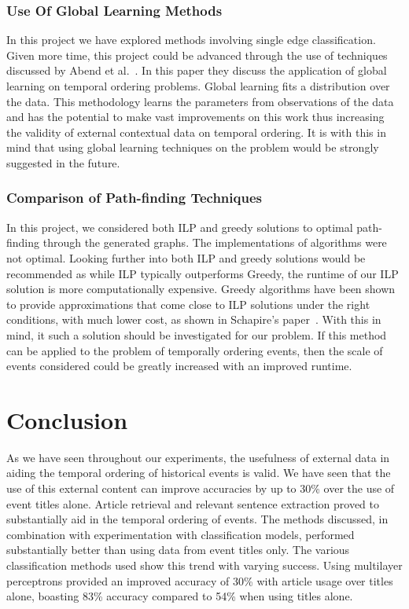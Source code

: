 \documentclass[bsc,frontabs,twoside,singlespacing,parskip,deptreport]{infthesis}     %
\begin{document}
\subsection{Use Of Global Learning Methods}
In this project we have explored methods involving single edge classification. Given more time,
this project could be advanced through the use of techniques discussed by Abend et al.~\cite{abend2015lexical}.
In this paper they discuss the application of global learning on temporal ordering problems. Global learning
fits a distribution over the data. This methodology learns the parameters from observations of the data~\cite{Huang2008}
and has the potential to make vast improvements on this work thus increasing the validity
of external contextual data on temporal ordering. It is with this in mind that using global learning techniques on the problem
would be strongly suggested in the future.

\subsection{Comparison of Path-finding Techniques}
In this project, we considered both ILP and greedy solutions to optimal path-finding through the generated graphs.
The implementations of algorithms were not optimal. Looking further into both ILP and greedy solutions would
be recommended as while ILP typically outperforms Greedy, the runtime of our ILP solution is more computationally
expensive. Greedy algorithms have been shown to provide approximations that come close to ILP solutions under the right
conditions, with much lower cost, as shown in Schapire's paper~\cite{schapire1998learning}. With this in mind,
it such a solution should be investigated for our problem. If this method can
be applied to the problem of temporally ordering events, then the scale of events considered could be greatly increased with
an improved runtime.



\chapter{Conclusion}
As we have seen throughout our experiments, the usefulness of external data in aiding the temporal ordering
of historical events is valid. We have seen that the use of this external content can improve accuracies by up to
30\% over the use of event titles alone.
Article retrieval and relevant sentence extraction proved to substantially aid in the temporal ordering of events.
The methods discussed, in combination with experimentation with classification models, performed substantially better
than using data from event titles only.
The various classification methods used show this trend with varying success. Using multilayer perceptrons provided an
improved accuracy of 30\% with article usage over titles alone, boasting 83\% accuracy compared to 54\% when using titles
alone.
\end{document}

